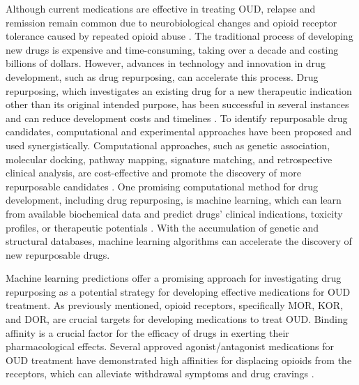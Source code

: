 \documentclass[10pt]{article}
\begin{document}
		Although current medications are effective in treating OUD, relapse and remission remain common due to neurobiological changes and opioid receptor tolerance caused by repeated opioid abuse \cite{wang2019historical}. The traditional process of developing new drugs is expensive and time-consuming, taking over a decade and costing billions of dollars. However, advances in technology and innovation in drug development, such as drug repurposing, can accelerate this process. Drug repurposing, which investigates an existing drug for a new therapeutic indication other than its original intended purpose, has been successful in several instances and can reduce development costs and timelines \cite{patwardhan2016innovative}. To identify repurposable drug candidates, computational and experimental approaches have been proposed and used synergistically. Computational approaches, such as genetic association, molecular docking, pathway mapping, signature matching, and retrospective clinical analysis, are cost-effective and promote the discovery of more repurposable candidates \cite{pushpakom2019drug,hegde2015unravelling, singh2017drug}. One promising computational method for drug development, including drug repurposing, is machine learning, which can learn from available biochemical data and predict drugs' clinical indications, toxicity profiles, or therapeutic potentials \cite{kim2019drug, napolitano2013drug, gilvary2020machine}. With the accumulation of genetic and structural databases, machine learning algorithms can accelerate the discovery of new repurposable drugs.
		
		
		
		Machine learning predictions offer a promising approach for investigating drug repurposing as a potential strategy for developing effective medications for OUD treatment. As previously mentioned, opioid receptors, specifically MOR, KOR, and DOR, are crucial targets for developing medications to treat OUD. Binding affinity is a crucial factor for the efficacy of drugs in exerting their pharmacological effects. Several approved agonist/antagonist medications for OUD treatment have demonstrated high affinities for displacing opioids from the receptors, which can alleviate withdrawal symptoms and drug cravings \cite{blanco2019management}.
		
\end{document}
